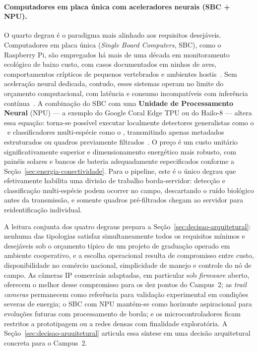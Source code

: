 \paragraph*{Computadores em placa única com aceleradores neurais (SBC + NPU).} O quarto degrau é o paradigma mais alinhado aos requisitos desejáveis. Computadores em placa única (\emph{Single Board Computers}, SBC), como o Raspberry Pi, são empregados há mais de uma década em monitoramento ecológico de baixo custo, com casos documentados em ninhos de aves, comportamentos crípticos de pequenos vertebrados e ambientes hostis~\cite{sargent2021raspberrypi}. Sem aceleração neural dedicada, contudo, esses sistemas operam no limite do orçamento computacional, com latência e consumo incompatíveis com inferência contínua~\cite{tiddeman2023lowpowerhardware}. A combinação do SBC com uma \textbf{Unidade de Processamento Neural} (NPU) --- a exemplo do Google Coral Edge TPU ou do Hailo-8 --- altera essa equação: torna-se possível executar localmente detectores generalistas como o \modeloMD~e classificadores multi-espécie como o \modeloSN, transmitindo apenas metadados estruturados ou quadros previamente filtrados~\cite{pishdast2025smartcameratraps,velasco2024smartcameratraps,mulero2025addressing}. O preço é um custo unitário significativamente superior e dimensionamento energético mais robusto, com painéis solares e bancos de bateria adequadamente especificados conforme a Seção~\ref{sec:energia-conectividade}. Para o pipeline, este é o único degrau que efetivamente habilita uma divisão de trabalho borda-servidor: detecção e classificação multi-espécie podem ocorrer no campo, descartando o ruído biológico antes da transmissão, e somente quadros pré-filtrados chegam ao servidor para reidentificação individual.

A leitura conjunta dos quatro degraus prepara a Seção~\ref{sec:decisao-arquitetural}: nenhuma das tipologias satisfaz simultaneamente todos os requisitos mínimos e desejáveis sob o orçamento típico de um projeto de graduação operado em ambiente cooperativo, e a escolha operacional resulta de compromisso entre custo, disponibilidade no comércio nacional, simplicidade de manejo e controle do nó de campo. As câmeras IP comerciais adaptadas, em particular sob \emph{firmware} aberto, oferecem o melhor desse compromisso para os dez pontos do Campus~2; as \emph{trail cameras} permanecem como referência para validação experimental em condições severas de energia; o SBC com NPU mantém-se como horizonte aspiracional para evoluções futuras com processamento de borda; e os microcontroladores ficam restritos a prototipagem ou a redes densas com finalidade exploratória. A Seção~\ref{sec:decisao-arquitetural} articula essa síntese em uma decisão arquitetural concreta para o Campus~2.
